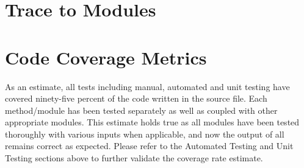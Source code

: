\documentclass[12pt, titlepage]{article}
\begin{document}
		
\section{Trace to Modules}		

\section{Code Coverage Metrics}

\par As an estimate, all tests including manual, automated and unit testing have covered ninety-five percent of the code written in the source file. Each method/module has been tested separately as well as coupled with other appropriate modules. This estimate holds true as all modules have been tested thoroughly with various inputs when applicable, and now the output of all remains correct as expected. Please refer to the Automated Testing and Unit Testing sections above to further validate the coverage rate estimate.
\end{document}

